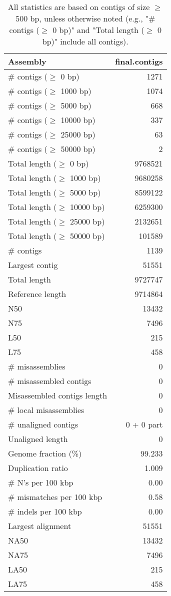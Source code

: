 \documentclass[12pt,a4paper]{article}
\begin{document}
\begin{table}[ht]
\begin{center}
\caption{All statistics are based on contigs of size $\geq$ 500 bp, unless otherwise noted (e.g., "\# contigs ($\geq$ 0 bp)" and "Total length ($\geq$ 0 bp)" include all contigs).}
\begin{tabular}{|l*{1}{|r}|}
\hline
Assembly & final.contigs \\ \hline
\# contigs ($\geq$ 0 bp) & 1271 \\ \hline
\# contigs ($\geq$ 1000 bp) & 1074 \\ \hline
\# contigs ($\geq$ 5000 bp) & 668 \\ \hline
\# contigs ($\geq$ 10000 bp) & 337 \\ \hline
\# contigs ($\geq$ 25000 bp) & 63 \\ \hline
\# contigs ($\geq$ 50000 bp) & 2 \\ \hline
Total length ($\geq$ 0 bp) & 9768521 \\ \hline
Total length ($\geq$ 1000 bp) & 9680258 \\ \hline
Total length ($\geq$ 5000 bp) & 8599122 \\ \hline
Total length ($\geq$ 10000 bp) & 6259300 \\ \hline
Total length ($\geq$ 25000 bp) & 2132651 \\ \hline
Total length ($\geq$ 50000 bp) & 101589 \\ \hline
\# contigs & 1139 \\ \hline
Largest contig & 51551 \\ \hline
Total length & 9727747 \\ \hline
Reference length & 9714864 \\ \hline
N50 & 13432 \\ \hline
N75 & 7496 \\ \hline
L50 & 215 \\ \hline
L75 & 458 \\ \hline
\# misassemblies & 0 \\ \hline
\# misassembled contigs & 0 \\ \hline
Misassembled contigs length & 0 \\ \hline
\# local misassemblies & 0 \\ \hline
\# unaligned contigs & 0 + 0 part \\ \hline
Unaligned length & 0 \\ \hline
Genome fraction (\%) & 99.233 \\ \hline
Duplication ratio & 1.009 \\ \hline
\# N's per 100 kbp & 0.00 \\ \hline
\# mismatches per 100 kbp & 0.58 \\ \hline
\# indels per 100 kbp & 0.00 \\ \hline
Largest alignment & 51551 \\ \hline
NA50 & 13432 \\ \hline
NA75 & 7496 \\ \hline
LA50 & 215 \\ \hline
LA75 & 458 \\ \hline
\end{tabular}
\end{center}
\end{table}
\end{document}

